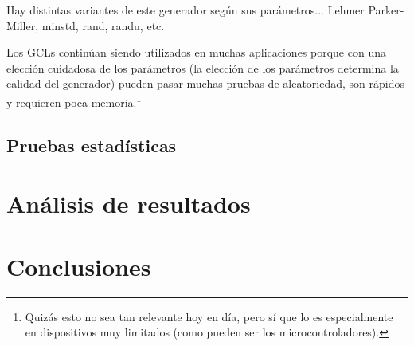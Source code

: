 Hay distintas variantes de este generador según sus parámetros... Lehmer Parker-Miller, minstd, rand, randu, etc.

Los GCLs continúan siendo utilizados en muchas aplicaciones porque con una elección cuidadosa de los parámetros (la elección de los parámetros determina la calidad del generador) pueden pasar muchas pruebas de aleatoriedad, son rápidos y requieren poca memoria.\footnote{Quizás esto no sea tan relevante hoy en día, pero sí que lo es especialmente en dispositivos muy limitados (como pueden ser los microcontroladores).}

\subsection{Pruebas estadísticas}




\section{Análisis de resultados}


\section{Conclusiones}
